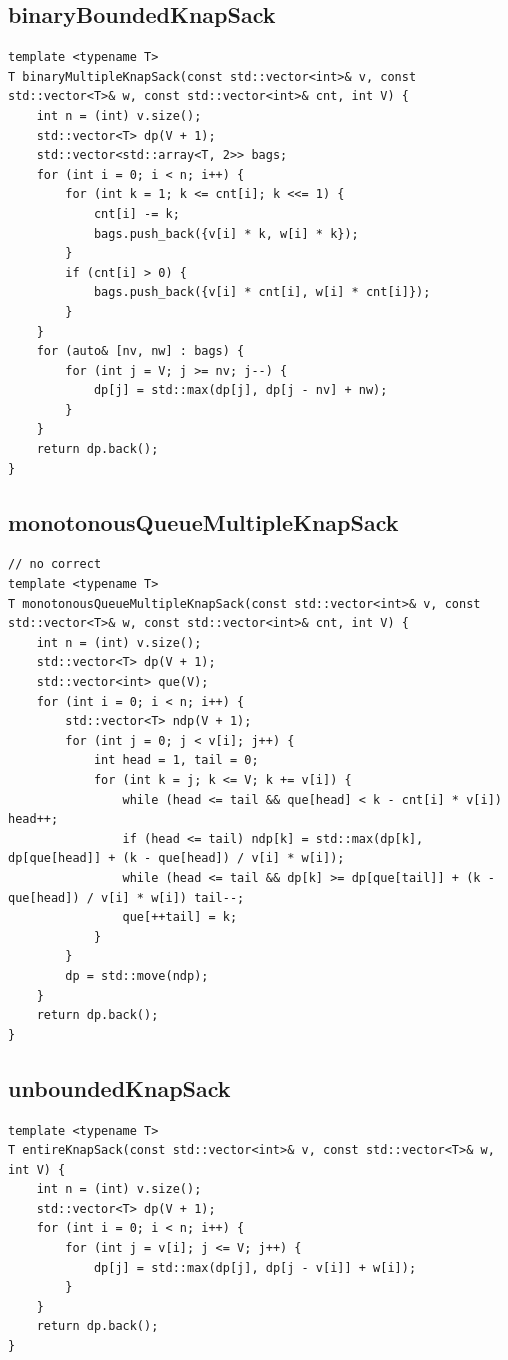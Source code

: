 \documentclass[twoside]{article}
\begin{document}
\subsection{binaryBoundedKnapSack}
\begin{lstlisting}
template <typename T>
T binaryMultipleKnapSack(const std::vector<int>& v, const std::vector<T>& w, const std::vector<int>& cnt, int V) {
    int n = (int) v.size();
    std::vector<T> dp(V + 1);
    std::vector<std::array<T, 2>> bags;
    for (int i = 0; i < n; i++) {
        for (int k = 1; k <= cnt[i]; k <<= 1) {
            cnt[i] -= k;
            bags.push_back({v[i] * k, w[i] * k});
        }
        if (cnt[i] > 0) {
            bags.push_back({v[i] * cnt[i], w[i] * cnt[i]});
        }
    }
    for (auto& [nv, nw] : bags) {
        for (int j = V; j >= nv; j--) {
            dp[j] = std::max(dp[j], dp[j - nv] + nw);
        }
    }
    return dp.back();
}\end{lstlisting}
\subsection{monotonousQueueMultipleKnapSack}
\begin{lstlisting}
// no correct
template <typename T>
T monotonousQueueMultipleKnapSack(const std::vector<int>& v, const std::vector<T>& w, const std::vector<int>& cnt, int V) {
    int n = (int) v.size();
    std::vector<T> dp(V + 1);
    std::vector<int> que(V);
    for (int i = 0; i < n; i++) {
        std::vector<T> ndp(V + 1);
        for (int j = 0; j < v[i]; j++) {
            int head = 1, tail = 0;
            for (int k = j; k <= V; k += v[i]) {
                while (head <= tail && que[head] < k - cnt[i] * v[i]) head++;
                if (head <= tail) ndp[k] = std::max(dp[k], dp[que[head]] + (k - que[head]) / v[i] * w[i]);
                while (head <= tail && dp[k] >= dp[que[tail]] + (k - que[head]) / v[i] * w[i]) tail--;
                que[++tail] = k;
            }
        }
        dp = std::move(ndp);
    }
    return dp.back();
}
\end{lstlisting}
\subsection{unboundedKnapSack}
\begin{lstlisting}
template <typename T>
T entireKnapSack(const std::vector<int>& v, const std::vector<T>& w, int V) {
    int n = (int) v.size();
    std::vector<T> dp(V + 1);
    for (int i = 0; i < n; i++) {
        for (int j = v[i]; j <= V; j++) {
            dp[j] = std::max(dp[j], dp[j - v[i]] + w[i]);
        }
    }
    return dp.back();
}\end{lstlisting}
\end{document}
